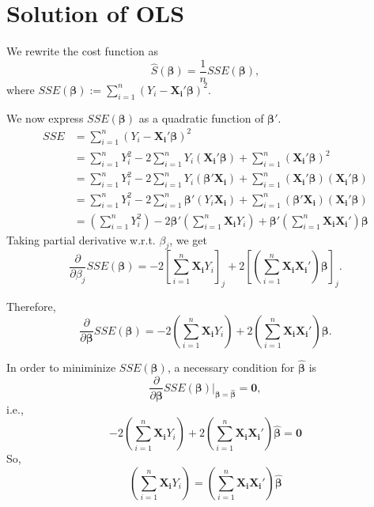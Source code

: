 \documentclass[
]{book}
\theoremstyle{definition}
\theoremstyle{definition}
\theoremstyle{definition}
\theoremstyle{definition}
\theoremstyle{remark}
\begin{document}
\hypertarget{solution-of-ols}{%
\section{Solution of OLS}\label{solution-of-ols}}

We rewrite the cost function as
\[
\widehat{S}(\pmb{\beta})=\frac{1}{n}SSE(\pmb{\beta}),
\]
where
\(SSE(\pmb{\beta}):=\sum\limits_{i=1}^n(Y_i-\pmb{X_i}'\pmb{\beta})^2\).

We now express \(SSE(\pmb{\beta})\) as a quadratic function of \(\pmb{\beta}'\).
\begin{align}
SSE &=\sum\limits_{i=1}^n(Y_i-\pmb{X_i}'\pmb{\beta})^2 \\
&=\sum\limits_{i=1}^n Y_i^2 
  - 2\sum\limits_{i=1}^n Y_i(\pmb{X_i}'\pmb{\beta})
  + \sum\limits_{i=1}^n (\pmb{X_i}'\pmb{\beta})^2 \\
&=\sum\limits_{i=1}^n Y_i^2 
  - 2\sum\limits_{i=1}^n Y_i(\pmb{\beta}'\pmb{X_i})
  + \sum\limits_{i=1}^n (\pmb{X_i}'\pmb{\beta})(\pmb{X_i}'\pmb{\beta}) \\
&=\sum\limits_{i=1}^n Y_i^2 
  - 2\sum\limits_{i=1}^n \pmb{\beta}'(Y_i\pmb{X_i})
  + \sum\limits_{i=1}^n (\pmb{\beta}'\pmb{X_i})(\pmb{X_i}'\pmb{\beta}) \\
&=\left(\sum\limits_{i=1}^n Y_i^2\right) 
  - 2\pmb{\beta}'\left(\sum\limits_{i=1}^n\pmb{X_i}Y_i\right)
  + \pmb{\beta}'\left(\sum\limits_{i=1}^n \pmb{X_i}\pmb{X_i}'\right)\pmb{\beta}
\end{align}
Taking partial derivative w.r.t. \(\beta_j\), we get
\[
\frac{\partial}{\partial\beta_j}SSE(\pmb{\beta})=-2\left[\sum\limits_{i=1}^n\pmb{X_i}Y_i\right]_j 
+ 2\left[\left(\sum\limits_{i=1}^n  \pmb{X_i}\pmb{X_i}'\right)\pmb{\beta}\right]_j.
\]

Therefore,
\[
\frac{\partial}{\partial\pmb{\beta}}SSE(\pmb{\beta})
=-2\left(\sum\limits_{i=1}^n\pmb{X_i}Y_i\right) 
+ 2\left(\sum\limits_{i=1}^n  \pmb{X_i}\pmb{X_i}'\right)\pmb{\beta}.
\]

In order to miniminize \(SSE(\pmb{\beta})\), a necessary condition for \(\widehat{\pmb{\beta}}\) is
\[
\frac{\partial}{\partial\pmb{\beta}}SSE(\pmb{\beta})\bigg|_{\pmb{\beta}
=\widehat{\pmb{\beta}}}=\pmb{0},
\]
i.e.,
\[
-2\left(\sum\limits_{i=1}^n\pmb{X_i}Y_i\right) 
+ 2\left(\sum\limits_{i=1}^n  \pmb{X_i}\pmb{X_i}'\right)\widehat{\pmb{\beta}}
=\pmb{0}
\]
So,
\begin{equation}
\left(\sum\limits_{i=1}^n\pmb{X_i}Y_i\right)
=\left(\sum\limits_{i=1}^n  \pmb{X_i}\pmb{X_i}'\right)\widehat{\pmb{\beta}}
\label{eq:moment-0}
\end{equation}
\end{document}
